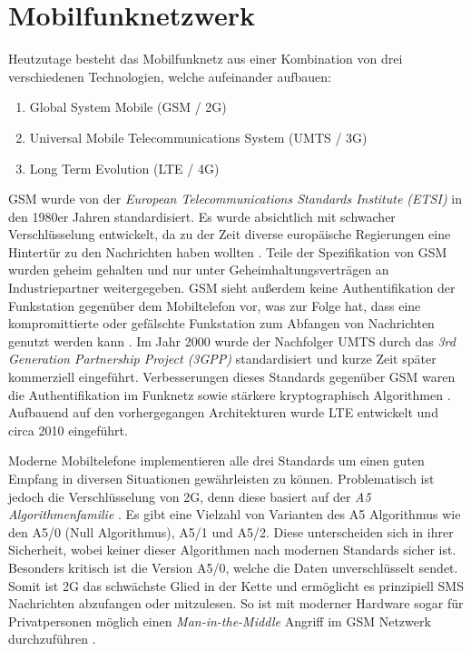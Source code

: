 \documentclass[11pt,a4paper,ngerman]{scrreprt}
\begin{document}
\section{Mobilfunknetzwerk}
Heutzutage besteht das Mobilfunknetz aus einer Kombination von drei verschiedenen Technologien, welche aufeinander aufbauen:
\begin{enumerate}
    \item Global System Mobile (GSM / 2G)
    \item Universal Mobile Telecommunications System (UMTS / 3G)
    \item Long Term Evolution (LTE / 4G)
\end{enumerate}
GSM wurde von der \textit{European  Telecommunications  Standards  Institute (ETSI)} in den 1980er Jahren standardisiert. Es wurde absichtlich mit schwacher Verschlüsselung entwickelt, da zu der Zeit diverse europäische Regierungen eine Hintertür zu den Nachrichten haben wollten \cite{mobileSec}. Teile der Spezifikation von GSM wurden geheim gehalten und nur unter Geheimhaltungsverträgen an Industriepartner weitergegeben. GSM sieht außerdem keine Authentifikation der Funkstation gegenüber dem Mobiltelefon vor, was zur Folge hat, dass eine kompromittierte oder gefälschte Funkstation zum Abfangen von Nachrichten genutzt werden kann \cite[S.\,202]{komSec13}. Im Jahr 2000 wurde der Nachfolger UMTS durch das \textit{3rd Generation Partnership Project (3GPP)} standardisiert und kurze Zeit später kommerziell eingeführt. Verbesserungen dieses Standards gegenüber GSM waren die Authentifikation im Funknetz sowie stärkere kryptographisch Algorithmen \cite[S.\,203]{komSec13}. Aufbauend auf den vorhergegangen Architekturen wurde LTE entwickelt und circa 2010 eingeführt.

Moderne Mobiltelefone implementieren alle drei Standards um einen guten Empfang in diversen Situationen gewährleisten zu können. Problematisch ist jedoch die Verschlüsselung von 2G, denn diese basiert auf der \emph{A5 Algorithmenfamilie} \cite{mobileSec}. Es gibt eine Vielzahl von Varianten des A5 Algorithmus wie den A5/0 (Null Algorithmus), A5/1 und A5/2. Diese unterscheiden sich in ihrer Sicherheit, wobei keiner dieser Algorithmen nach modernen Standards sicher ist. Besonders kritisch ist die Version A5/0, welche die Daten unverschlüsselt sendet. Somit ist 2G das schwächste Glied in der Kette und ermöglicht es prinzipiell SMS Nachrichten abzufangen oder mitzulesen. So ist mit moderner Hardware sogar für Privatpersonen möglich einen \textit{Man-in-the-Middle} Angriff im GSM Netzwerk durchzuführen \cite[S.\,202]{komSec13}.
\end{document}

